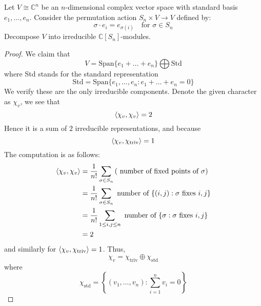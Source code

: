 \begin{prob}[S2008-Q4]
    Let \( V \cong \mathbb{C}^n \) be an \( n \)-dimensional complex vector space with standard basis \( e_1, \ldots, e_n \). Consider the permutation action \( S_n \times V \to V \) defined by:
    \[
    \sigma \cdot e_i = e_{\sigma(i)} \quad \text{for } \sigma \in S_n
    \]
    Decompose \( V \) into irreducible \( \mathbb{C}[S_n] \)-modules.
\end{prob}
\begin{proof}
    We claim that 
    \begin{equation*}
        V=\text{Span}\{e_1+\dots+e_n\}\bigoplus\text{Std}
    \end{equation*}
    where Std stands for the standard representation 
    \begin{equation*}
        \text{Std}=\text{Span}\{e_1,\dots, e_n: e_1+\dots+e_n=0\}
    \end{equation*}
    We verify these are the only irreducible components. Denote the given character as $\chi_v$, we see that
    \begin{equation*}
        \langle\chi_v,\chi_v\rangle=2
    \end{equation*}
    Hence it is a sum of $2$ irreducible representations, and because 
    \begin{equation*}
        \langle\chi_v,\chi_{\text{triv}}\rangle=1
    \end{equation*}
    The computation is as follows: 
    \begin{align*}
        \langle\chi_v,\chi_v\rangle&=\frac{1}{n!}\sum_{\sigma\in S_n}\left(\text{ number of fixed points of $\sigma$}\right)\\
        &=\frac{1}{n!}\sum_{\sigma\in S_n}\text{ number of }\{(i,j): \sigma \text{ fixes } i, j\}\\
        &=\frac{1}{n!}\sum_{1\leq i,j\leq n}\text{ number of }\{\sigma: \sigma \text{ fixes } i,j\}\\
        &=2
    \end{align*}
    and similarly for $\langle\chi_v,\chi_{\text{triv}}\rangle=1$. Thus,
    \begin{equation*}
        \chi_v=\chi_{\text{triv}}\oplus\chi_{\text{std}}
    \end{equation*}
    where 
    \begin{equation*}
        \chi_{\text{std}}=\left\{(v_1,\dots,v_n): \sum_{i=1}^nv_i=0\right\}
    \end{equation*}
\end{proof}









